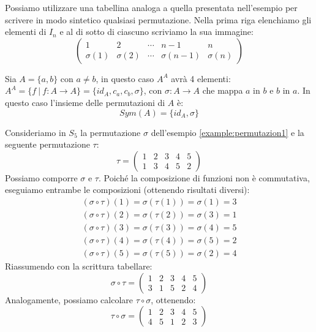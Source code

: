 Possiamo utilizzare una tabellina analoga a quella presentata nell'esempio per scrivere in modo sintetico qualsiasi permutazione. Nella prima riga elenchiamo gli elementi di $I_{n}$ e al di sotto di ciascuno scriviamo la sua immagine:
\begin{displaymath}
	\left(
	\begin{array}{ccccc}
		1 & 2 & \cdots & n-1 & n \\
		\sigma(1) & \sigma(2) & \cdots & \sigma(n-1) & \sigma(n)
	\end{array}
	\right)
\end{displaymath}
\begin{example}
	Sia $A=\{a,b\}$ con $a \neq b$, in questo caso $A^{A}$ avrà 4 elementi: $A^{A} = \{f \ | \ f: A \rightarrow A\}= \{id_{A}, c_{a}, c_{b}, \sigma \}$, con $\sigma : A \longrightarrow A$ che mappa $a$ in $b$ e $b$ in $a$. In questo caso l'insieme delle permutazioni di $A$ è:
	$$Sym(A)=\{id_{A},\sigma\}$$
\end{example}
\begin{example}
Consideriamo in $S_{5}$ la permutazione $\sigma$ dell'esempio \ref{example:permutazion1} e la seguente permutazione $\tau$:
	\begin{displaymath}
		\tau =
		\left(
		\begin{array}{lllll}
			1 & 2 & 3 & 4 & 5 \\
			1 & 3 & 4 & 5 & 2
		\end{array}
		\right)
	\end{displaymath}
	Possiamo comporre $\sigma$ e $\tau$. Poiché la composizione di funzioni non è commutativa, eseguiamo entrambe le composizioni (ottenendo risultati diversi):
	\begin{displaymath}
		\begin{array}{l}
			(\sigma \circ \tau)(1)=\sigma(\tau(1))=\sigma(1)=3 \\
			(\sigma \circ \tau)(2)=\sigma(\tau(2))=\sigma(3)=1 \\
			(\sigma \circ \tau)(3)=\sigma(\tau(3))=\sigma(4)=5 \\
			(\sigma \circ \tau)(4)=\sigma(\tau(4))=\sigma(5)=2 \\
			(\sigma \circ \tau)(5)=\sigma(\tau(5))=\sigma(2)=4
		\end{array}
	\end{displaymath}
	Riassumendo con la scrittura tabellare:
	\begin{displaymath}
		\sigma \circ \tau =
		\left(
		\begin{array}{lllll}
			1 & 2 & 3 & 4 & 5 \\
			3 & 1 & 5 & 2 & 4
		\end{array}
		\right)
	\end{displaymath}
	Analogamente, possiamo calcolare $\tau \circ \sigma$, ottenendo:
	\begin{displaymath}
		\tau \circ \sigma =
		\left(
		\begin{array}{lllll}
			1 & 2 & 3 & 4 & 5 \\
			4 & 5 & 1 & 2 & 3
		\end{array}
		\right)
	\end{displaymath}
\end{example}

